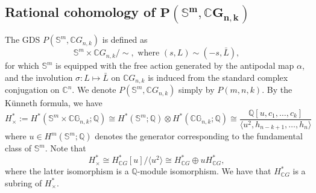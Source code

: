 \documentclass{amsart}
\begin{document}
	
	
	
	
	
	\subsection{Rational cohomology of $\mathbf{P(\mathbb S^m,\mathbb CG_{n,k})}$} \label{gds}
	
	
	The GDS $P(\mathbb S^m,\mathbb CG_{n,k})$ is defined as
	\[
	\mathbb S^m\times \mathbb CG_{n,k}/\!\!\sim, \text { where } (s,L)\sim (-s,\bar L),
	\]
for which $\mathbb S^m$ %
is equipped with the free action generated by the antipodal %
map $\alpha$, and %
the involution $\sigma: L \mapsto \bar L$ on $\mathbb CG_{n,k}$ is induced from the standard complex conjugation on $\mathbb C^n.$ We denote $P(\mathbb S^m,\mathbb CG_{n,k})$ simply by $P(m,n,k).$
	By the K\"unneth formula, we %
have
	\begin{equation}\label{Cohomology of H_times}
		H_{\times}^* := H^*(\mathbb{S}^m \times \mathbb{CG}_{n,k}; \mathbb{Q}) \cong H^*(\mathbb{S}^m; \mathbb{Q}) \otimes H^*(\mathbb{CG}_{n,k}; \mathbb{Q}) \cong \frac{\mathbb{Q}[u, c_1, \dots, c_k]}{\langle u^2, h_{n-k+1}, \dots, h_n \rangle}
	\end{equation}
	where %
$u \in H^m(\mathbb S^m; \mathbb Q)$ denotes the generator corresponding to the fundamental class of $\mathbb S^m$. Note that \begin{equation}\label{H in terms of u}
		H^*_{\times} \cong H^*_{\mathbb{C}G}[u]/\langle u^2 \rangle \cong H^*_{\mathbb{C}G} \oplus u H^*_{\mathbb{C}G},
	\end{equation} where the latter isomorphism is a $\mathbb Q$-module isomorphism. We have that $H^*_{\mathbb{C}G}$ is a subring of $H^*_\times$.
\end{document}
